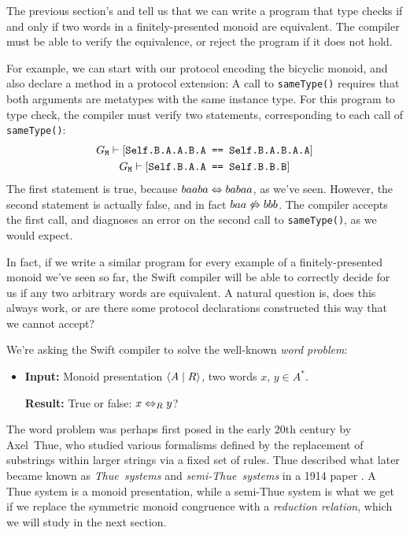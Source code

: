\documentclass[../generics]{subfiles}
\begin{document}
The previous section's  and  tell us that we can write a program that type checks if and only if two words in a finitely-presented monoid are equivalent. The compiler must be able to verify the equivalence, or reject the program if it does not hold.

For example, we can start with our protocol encoding the bicyclic monoid, and also declare a method in a protocol extension:
A call to \texttt{sameType()} requires that both arguments are metatypes with the same instance type. For this program to type check, the compiler must verify two statements, corresponding to each call of \texttt{sameType()}:
\begin{gather*}
G_\texttt{M}\vdash[\texttt{Self.B.A.A.B.A == Self.B.A.B.A.A}]\\
G_\texttt{M}\vdash[\texttt{Self.B.A.A == Self.B.B.B}]
\end{gather*}
The first statement is true, because $baaba\Leftrightarrow babaa$, as we've seen. However, the second statement is actually false, and in fact $baa\not\Leftrightarrow bbb$. The compiler accepts the first call, and diagnoses an error on the second call to \texttt{sameType()}, as we would expect.

In fact, if we write a similar program for every example of a finitely-presented monoid we've seen so far, the Swift compiler will be able to correctly decide for us if any two arbitrary words are equivalent. A natural question is, does this always work, or are there some protocol declarations constructed this way that we cannot accept?

We're asking the Swift compiler to solve the well-known \emph{word problem}:
\begin{itemize}
\item
\textbf{Input:} Monoid presentation $\langle A \mid R\rangle$, two words $x$, $y\in A^*$.

\textbf{Result:} True or false: $x\Leftrightarrow_R y$?
\end{itemize}

The word problem was perhaps first posed in the early 20th century by Axel~Thue, who studied various formalisms defined by the replacement of substrings within larger strings via a fixed set of rules. Thue described what later became known as \emph{Thue~systems} and \emph{semi-Thue~systems} in a 1914 paper \cite{thue_translation}. A Thue system is a monoid presentation, while a semi-Thue system is what we get if we replace the symmetric monoid congruence with a \emph{reduction relation}, which we will study in the next section.
\end{document}
